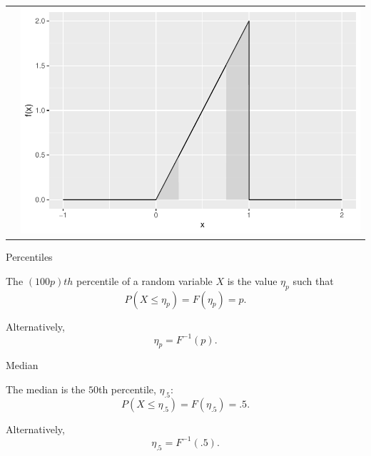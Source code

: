 \begin{frame}
\begin{block}{\examplectd}
\begin{tabular}{cc}
      & \includegraphics[height=.325\textheight]{figure/example-16-3-4}\\
    \end{tabular}
  \end{block}
\end{frame}

\begin{frame}

\begin{block}{Percentiles}

The $(100p)th$ percentile of a random variable $X$ is the value $\eta_p$ such that
$$
P(X \leq \eta_p)=F(\eta_p)=p.
$$

\medskip

Alternatively,
$$
\eta_p=F^{-1}(p).
$$
\end{block}

\end{frame}

\begin{frame}

\begin{block}{Median}

The median is the $50$th percentile, $\eta_{.5}$:
$$
P(X \leq \eta_{.5})=F(\eta_{.5})=.5.
$$

\medskip

Alternatively,
$$
\eta_{.5}=F^{-1}(.5).
$$
\end{block}

\end{frame}




